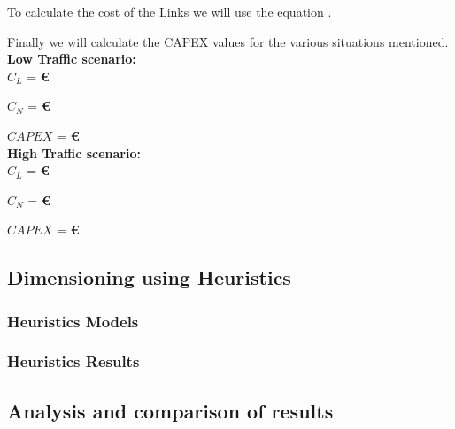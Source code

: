 


To calculate the cost of the Links we will use the equation .

	

Finally we will calculate the CAPEX values for the various situations mentioned.\\

\textbf{Low Traffic scenario:}\\

$C_L$ = \textbf{\euro}

$C_N$ = \textbf{\euro}

$CAPEX$ = \textbf{\euro}\\

\textbf{High Traffic scenario:}\\

$C_L$ = \textbf{\euro}

$C_N$ = \textbf{ \euro}

$CAPEX$ =  \textbf{ \euro}\\



\subsection{Dimensioning using Heuristics}

\subsubsection{Heuristics Models}

\subsubsection{Heuristics Results}

\subsection{Analysis and comparison of results}
